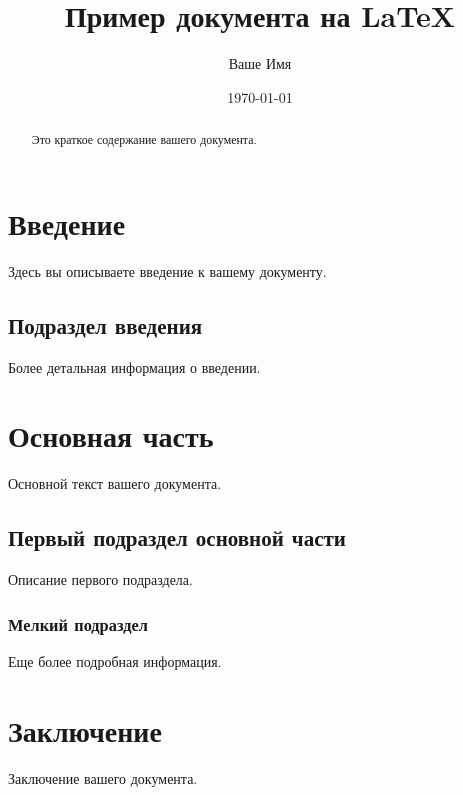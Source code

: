 \documentclass{article}
\begin{document}
\title{Пример документа на LaTeX}
\author{Ваше Имя}
\date{\today}

\maketitle

\begin{abstract}
Это краткое содержание вашего документа.
\end{abstract}

\section{Введение}
Здесь вы описываете введение к вашему документу.

\subsection{Подраздел введения}
Более детальная информация о введении.

\section{Основная часть}
Основной текст вашего документа.

\subsection{Первый подраздел основной части}
Описание первого подраздела.

\subsubsection{Мелкий подраздел}
Еще более подробная информация.

\section{Заключение}
Заключение вашего документа.
\end{document}
